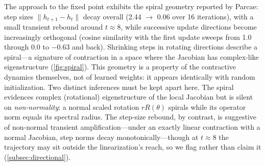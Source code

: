 \documentclass[11pt]{article}
\begin{document}
The approach to the fixed point exhibits the spiral geometry reported by Parcae: step sizes $\|h_{t+1} - h_t\|$ decay overall (2.44 $\to$ 0.06 over 16 iterations), with a small transient rebound around $t \approx 8$, while successive update directions become increasingly orthogonal (cosine similarity with the first update sweeps from 1.0 through 0.0 to $-0.63$ and back). Shrinking steps in rotating directions describe a spiral---a signature of contraction in a space where the Jacobian has complex-like eigenstructure (\cref{fig:spiral}). This geometry is a property of the contractive dynamics themselves, not of learned weights: it appears identically with random initialization. Two distinct inferences must be kept apart here. The spiral evidences complex (rotational) eigenstructure of the local Jacobian but is silent on \emph{non-normality}: a normal scaled rotation $rR(\theta)$ spirals while its operator norm equals its spectral radius. The step-size rebound, by contrast, is suggestive of non-normal transient amplification---under an exactly linear contraction with a normal Jacobian, step norms decay monotonically---though at $t \approx 8$ the trajectory may sit outside the linearization's reach, so we flag rather than claim it (\cref{subsec:directional}).
\end{document}
